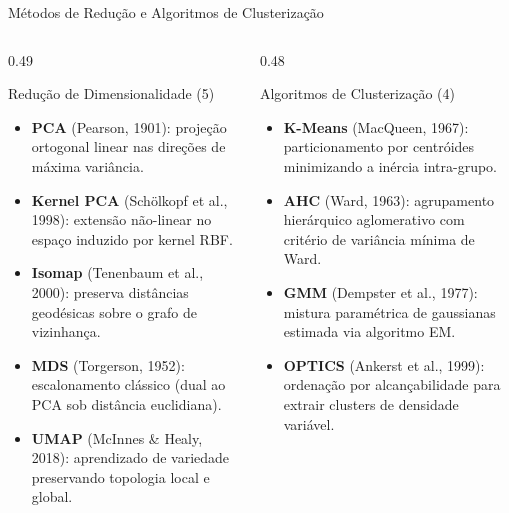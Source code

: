 \documentclass[aspectratio=169,11pt]{beamer}
\begin{document}
\begin{frame}{Métodos de Redução e Algoritmos de Clusterização}
  \begin{columns}[T,onlytextwidth]
    \begin{column}{0.49\textwidth}
      \begin{block}{Redução de Dimensionalidade (5)}
        \footnotesize
        \begin{itemize}
          \setlength{\itemsep}{2pt}
          \item \textbf{PCA} (Pearson, 1901): projeção ortogonal linear nas
                direções de máxima variância.
          \item \textbf{Kernel PCA} (Schölkopf et al., 1998): extensão não-linear
                no espaço induzido por kernel RBF.
          \item \textbf{Isomap} (Tenenbaum et al., 2000): preserva distâncias
                geodésicas sobre o grafo de vizinhança.
          \item \textbf{MDS} (Torgerson, 1952): escalonamento clássico
                (dual ao PCA sob distância euclidiana).
          \item \textbf{UMAP} (McInnes \& Healy, 2018): aprendizado de variedade
                preservando topologia local e global.
        \end{itemize}
      \end{block}
    \end{column}
    \begin{column}{0.48\textwidth}
      \begin{block}{Algoritmos de Clusterização (4)}
        \footnotesize
        \begin{itemize}
          \setlength{\itemsep}{2pt}
          \item \textbf{K-Means} (MacQueen, 1967): particionamento por
                centróides minimizando a inércia intra-grupo.
          \item \textbf{AHC} (Ward, 1963): agrupamento hierárquico aglomerativo
                com critério de variância mínima de Ward.
          \item \textbf{GMM} (Dempster et al., 1977): mistura paramétrica de
                gaussianas estimada via algoritmo EM.
          \item \textbf{OPTICS} (Ankerst et al., 1999): ordenação por
                alcançabilidade para extrair clusters de densidade variável.
        \end{itemize}
      \end{block}
    \end{column}
  \end{columns}
\end{frame}
\end{document}
